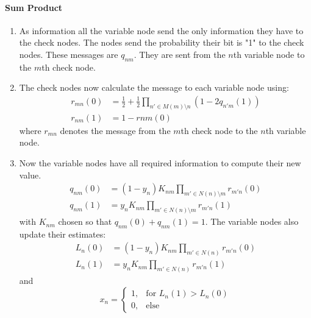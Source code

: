 \paragraph{Sum Product}
\begin{enumerate}
	\item As information all the variable node send the only information they have to the check nodes. The nodes send the probability their bit is "1" to the check nodes. These messages are $q_{nm}$. They are sent from the $n$th variable node to the $m$th check node.
	\item The check nodes now calculate the message to each variable node using:
		\begin{align*}
			r_{mn}(0) & = \frac{1}{2} + \frac{1}{2} \prod_{n' \in M(m) \setminus n}\left(1 - 2 q_{n'm}(1)\right) \\
			r_{nm}(1) & = 1 - r{nm}(0)
		\end{align*}
		where $r_{mn}$ denotes the message from the $m$th check node to the $n$th variable node.
	\item Now the variable nodes have all required information to compute their new value.
		\begin{align*}
			q_{nm}(0) & = (1 - y_n) K_{nm} \prod_{m' \in N(n) \setminus m}r_{m'n}(0) \\
			q_{nm}(1) & = y_n K_{nm} \prod_{m' \in N(n) \setminus m}r_{m'n}(1)
		\end{align*}
		with $K_{nm}$ chosen so that $q_{nm}(0) + q_{nm}(1) = 1$. The variable nodes also update their estimates:
		\begin{align*}
			L_n(0) & = (1 - y_n) K_{nm} \prod_{m' \in N(n)}r_{m'n}(0) \\
			L_n(1) & = y_n K_{nm} \prod_{m' \in N(n)}r_{m'n}(1)
		\end{align*}
		and
		\begin{equation*}
			x_n = \begin{cases}
				1, & \text{for } L_n(1) > L_n(0) \\
				0, & \text{else}
			\end{cases}
		\end{equation*}
\end{enumerate}

